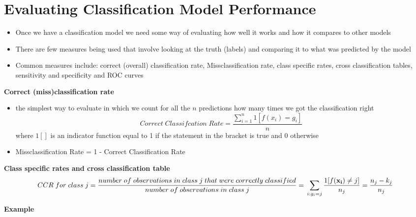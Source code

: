 \documentclass[
]{book}
\providecommand{\tightlist}{%
  \setlength{\itemsep}{0pt}\setlength{\parskip}{0pt}}
\theoremstyle{definition}
\theoremstyle{definition}
\theoremstyle{definition}
\theoremstyle{remark}
\begin{document}
\hypertarget{evaluating-classification-model-performance}{%
\section{Evaluating Classification Model Performance}\label{evaluating-classification-model-performance}}

\begin{itemize}
\tightlist
\item
  Once we have a classification model we need some way of evaluating how well it works and how it compares to other models
\item
  There are few measures being used that involve looking at the truth (labels) and comparing it to what was predicted by the model
\item
  Common measures include: correct (overall) classification rate, Missclassification rate, class specific rates, cross classification tables, sensitivity and specificity and ROC curves
\end{itemize}

\textbf{Correct (miss)classification rate}

\begin{itemize}
\tightlist
\item
  the simplest way to evaluate in which we count for all the \(n\) predictions how many times we got the classification right
  \[Correct\; Classifcation \; Rate = \frac{\sum_{i=1}^{n}1[f(x_i)=g_i]}{n}\] where
  \(1[]\) is an indicator function equal to 1 if the statement in the bracket is true and 0 otherwise
\item
  Missclassification Rate = 1 - Correct Classification Rate
\end{itemize}

\textbf{Class specific rates and cross classification table}
\[CCR \; for \; class\; j =  \frac{number \; of \; observations \; in \; class \; j \; that \; were \; correctly \; classified}{number \; of \; observations \; in \; class \; j} = \\ \sum_{i:g_i=j}{\frac{1[f(\mathbf{x_i})\neq j]}{n_j} = \frac{n_j-k_j}{n_j}}\]

\textbf{Example}
\end{document}
